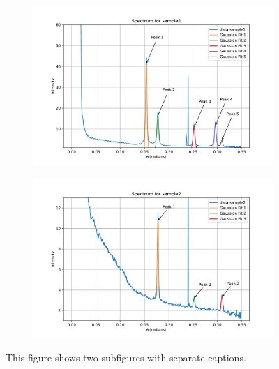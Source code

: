 \begin{figure}[H]
    \centering
    \begin{subfigure}[b]{0.99\textwidth} 
        \includegraphics[width=\textwidth]{Figures/gaussian_sample1.pdf}
        \label{fig:subfigure1}
    \end{subfigure}
    \begin{subfigure}[b]{0.99\textwidth} 
        \includegraphics[width=\textwidth]{Figures/gaussian_sample2.pdf}
        \label{fig:subfigure2}
    \end{subfigure}
    \caption{This figure shows two subfigures with separate captions.}
    \label{fig:result_figure}
\end{figure}
